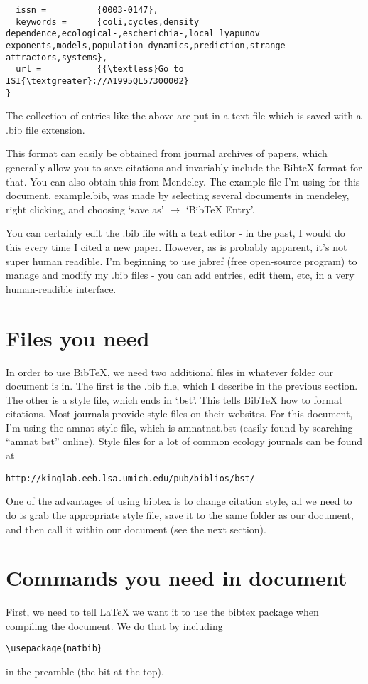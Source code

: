 \documentclass[11pt,a4paper]{article}
\begin{document}
\begin{verbatim}
  issn =          {0003-0147},
  keywords =      {coli,cycles,density dependence,ecological-,escherichia-,local lyapunov exponents,models,population-dynamics,prediction,strange attractors,systems},
  url =           {{\textless}Go to ISI{\textgreater}://A1995QL57300002}
}
\end{verbatim}

The collection of entries like the above are put in a text file which is saved with a .bib file extension.

This format can easily be obtained from journal archives of papers, which generally allow you to save citations and invariably include the BibteX format for that. You can also obtain this from Mendeley. The example file I'm using for this document, example.bib, was made by selecting several documents in mendeley,
right clicking, and choosing `save as' $\rightarrow$ `BibTeX Entry'.

You can certainly edit the .bib file with a text editor - in the past, I would do this every time I cited a new paper. However, as is probably apparent, it's not super human readible. I'm beginning to use jabref (free open-source program) to manage and modify my .bib files - you can add entries, edit them, etc, in a very human-readible interface.

\section{Files you need}
In order to use BibTeX, we need two additional files in whatever folder our document is in. The first is the .bib file, which I describe in the previous section. The other is a style file, which ends in `.bst'. This tells BibTeX how to format citations. Most journals provide style files on their websites. For this document, I'm using the amnat style file, which is amnatnat.bst (easily found by searching ``amnat bst'' online). Style files for a lot of common ecology journals can be found at
\begin{verbatim}
http://kinglab.eeb.lsa.umich.edu/pub/biblios/bst/
\end{verbatim}

One of the advantages of using bibtex is to change citation style, all we need to do is grab the appropriate style file, save it to the same folder as our document, and then call it within our document (see the next section).
\section{Commands you need in document}
First, we need to tell LaTeX we want it to use the bibtex package when compiling the document. We do that by including
\begin{verbatim}
\usepackage{natbib}
\end{verbatim}
in the preamble (the bit at the top).
\end{document}
